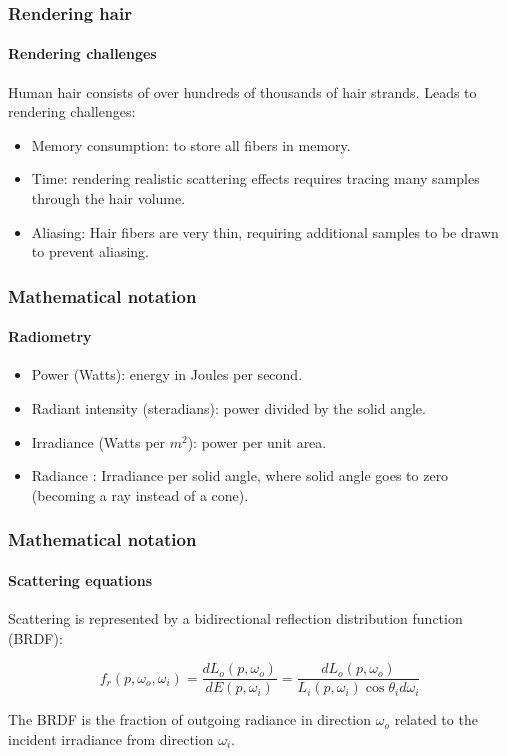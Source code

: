 \documentclass{beamer}
\begin{document}
  \begin{frame}
    \frametitle{Rendering hair}
	\framesubtitle{Rendering challenges}
	
	Human hair consists of over hundreds of thousands of hair strands.
	Leads to rendering challenges:
	\begin{itemize}
	\item Memory consumption: to store all fibers in memory.
	\item Time: rendering realistic scattering effects requires tracing many samples through the hair volume.
	\item Aliasing: Hair fibers are very thin, requiring additional samples to be drawn to prevent aliasing.
	\end{itemize}
	

  \end{frame}
  
  
  \begin{frame}
    \frametitle{Mathematical notation}
	\framesubtitle{Radiometry}
	\begin{itemize}
	\item Power (Watts): energy in Joules per second.
	\item Radiant intensity (steradians): power divided by the solid angle.
	\item Irradiance (Watts per $m^2$): power per unit area.
	\item Radiance : Irradiance per solid angle, where solid angle goes to zero (becoming a ray instead of a cone).
	\end{itemize}
  \end{frame}
  
  \begin{frame}
    \frametitle{Mathematical notation}
	\framesubtitle{Scattering equations}
	
	Scattering is represented by a bidirectional reflection distribution function (BRDF):
	
	\begin{equation}
	f_r(p, \omega_o, \omega_i) = \frac{dL_o(p, \omega_o)}{dE(p, \omega_i)} = \frac{dL_o(p, \omega_o)}{L_i(p, \omega_i) \cos \theta_i d\omega_i}
	\end{equation}
	
	The BRDF is the fraction of outgoing radiance in direction $\omega_o$ related to the incident irradiance from direction $\omega_i$.

  \end{frame}
  
\end{document}
